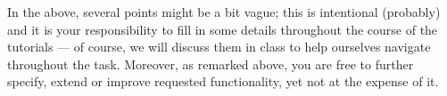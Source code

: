\documentclass[a4paper, 10pt]{article}
\begin{document}
	In the above, several points might be a bit vague; this is intentional (probably) and it is your responsibility to fill in some details throughout the course of the tutorials --- of course, we will discuss them in class to help ourselves navigate throughout the task. Moreover, as remarked above, you are free to further specify, extend or improve requested functionality, yet not at the expense of it.
\end{document}
